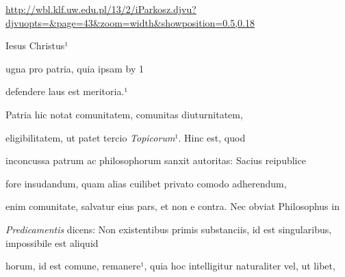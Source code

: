 
\newParkoszpage

{
\url{http://wbl.klf.uw.edu.pl/13/2/iParkosz.djvu?djvuopts=&page=43&zoom=width&showposition=0.5,0.18}
}


\fulllines
  
  Iesus Christus¹

  ugna pro patria, quia ipsam
  \advance\plineno by 1


defendere laus est meritoria.¹
%




  
Patria hic notat comunitatem, comunitas diuturnitatem, 

 eligibilitatem, ut patet tercio \textit{Topicorum}¹. Hinc est, quod

inconcussa patrum ac philosophorum sanxit autoritas: Sacius reipublice

fore insudandum, quam alias cuilibet privato comodo adherendum, 

 enim comunitate, salvatur eius pars, et non e contra. Nec obviat Philosophus in

\textit{Predicamentis} dicens: Non existentibus primis substanciis, id est singularibus, impossibile est aliquid



horum, id est comune, remanere¹, quia hoc intelligitur naturaliter vel, ut libet,


